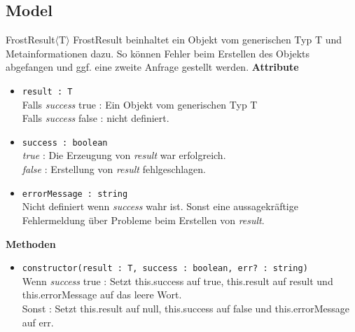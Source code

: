 \subsection{Model}

    \begin{Class}{FrostResult$\langle$T$\rangle$}
        FrostResult beinhaltet ein Objekt vom generischen Typ T und Metainformationen dazu.
        So können Fehler beim Erstellen des Objekts abgefangen und ggf. eine zweite Anfrage gestellt werden.
        \textbf{Attribute}
        \begin{itemize}
            \item \texttt{result : T}
            \\ Falls \emph{success} true : Ein Objekt vom generischen Typ T
            \\ Falls \emph{success} false : nicht definiert.
            \item \texttt{success : boolean}
            \\ \emph{true} : Die Erzeugung von \emph{result} war erfolgreich.
            \\ \emph{false} : Erstellung von \emph{result} fehlgeschlagen.
            \item \texttt{errorMessage : string}
            \\ Nicht definiert wenn \emph{success} wahr ist.
            Sonst eine aussagekräftige Fehlermeldung über Probleme beim Erstellen von \emph{result}.
        \end{itemize}

        \textbf{Methoden}
        \begin{itemize}
            \item \texttt{constructor(result : T, success : boolean, err? : string)}
            \\ Wenn \emph{success} true : Setzt this.success auf true,  this.result auf result und this.errorMessage auf das leere Wort.
            \\ Sonst : Setzt this.result auf null, this.success auf false und this.errorMessage auf err.
        \end{itemize}
    \end{Class}

